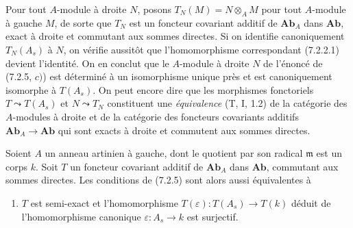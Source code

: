 \begin{remark}[7.2.6]
Pour tout $A$-module à droite $N$, posons
$T_N(M)=N\otimes_A M$
pour tout $A$-module à gauche $M$, de sorte que $T_N$ est un foncteur
covariant additif de $\boldsymbol{Ab}_A$ dans $\boldsymbol{Ab}$, exact à droite et
commutant aux sommes directes. Si on identifie canoniquement $T_N(A_s)$ à
$N$, on vérifie aussitôt que l'homomorphisme correspondant (7.2.2.1) devient
l'identité. On en conclut que le $A$-module à droite $N$ de l'énoncé de
(7.2.5, $c)$) est déterminé à un isomorphisme unique près et est
canoniquement isomorphe à $T(A_s)$. On peut encore dire que les morphismes
fonctoriels
$T\leadsto T(A_s)$ et $N\leadsto T_N$
constituent une \emph{équivalence} (T, I, 1.2) de la catégorie des $A$-modules à
droite et de la catégorie des foncteurs covariants additifs
$\boldsymbol{Ab}_A\to\boldsymbol{Ab}$ qui sont exacts à droite et commutent aux
sommes directes.
\end{remark}

\begin{proposition}[7.2.7]
Soient $A$ un anneau artinien à gauche, dont le quotient par son radical
$\mathfrak m$ est un corps $k$. Soit $T$ un foncteur covariant additif de
$\boldsymbol{Ab}_A$ dans $\boldsymbol{Ab}$, commutant aux sommes directes. Les
conditions de \textup{(7.2.5)} sont alors aussi équivalentes à
\begin{enumerate}
  \item[d)] $T$ est semi-exact et l'homomorphisme
    $T(\varepsilon):T(A_s)\longrightarrow T(k)$
    déduit de l'homomorphisme canonique $\varepsilon:A_s\to k$ est surjectif.
\end{enumerate}
\end{proposition}

